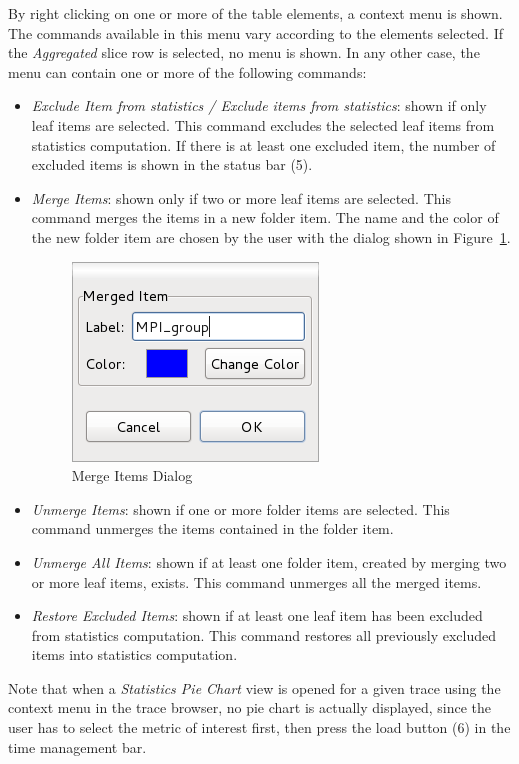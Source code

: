 \documentclass[twoside]{article}
\begin{document}
\begin{sloppypar}
By right clicking on one or more of the table elements, a context menu is shown.
The commands available in this menu vary according to the elements selected.
If the \emph{Aggregated} slice row is selected, no menu is shown.
In any other case, the menu can contain one or more of the following commands:
\begin{itemize}
 \item \emph{Exclude Item from statistics / Exclude items from statistics}: shown if only leaf items are selected. This command excludes the selected leaf items from statistics computation. If there is at least one excluded item, the number of excluded items is shown in the status bar (\num{5}).
 \item \emph{Merge Items}: shown only if two or more leaf items are selected. This command merges the items in a new folder item. The name and the color of the new folder item are chosen by the user with the dialog shown in Figure~\ref{fig:merge_dialog}.
    \begin{figure}[h!]
      \centering
	\includegraphics[width=.25\textwidth]{images/dialog_merge.png}
      \caption{Merge Items Dialog}
      \label{fig:merge_dialog}
    \end{figure} 
 \item \emph{Unmerge Items}: shown if one or more folder items are selected. This command unmerges the items contained in the folder item.
 \item \emph{Unmerge All Items}: shown if at least one folder item, created by merging two or more leaf items, exists. This command unmerges all the merged items. 
 \item \emph{Restore Excluded Items}: shown if at least one leaf item has been excluded from statistics computation. This command restores all previously excluded items into statistics computation.
\end{itemize}

Note that when a \emph{Statistics Pie Chart} view is opened for a given trace using the context menu in the trace browser, no pie chart is actually displayed, since the user has to select the metric of interest first, then press the load button (\num{6}) in the time management bar.


\end{sloppypar}
\end{document}
